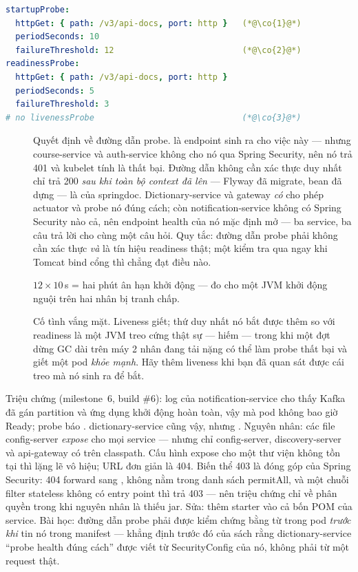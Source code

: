\begin{lstlisting}[language=yaml]
startupProbe:
  httpGet: { path: /v3/api-docs, port: http }   (*@\co{1}@*)
  periodSeconds: 10
  failureThreshold: 12                          (*@\co{2}@*)
readinessProbe:
  httpGet: { path: /v3/api-docs, port: http }
  periodSeconds: 5
  failureThreshold: 3
# no livenessProbe                              (*@\co{3}@*)
\end{lstlisting}

\begin{description}
  \item[] Quyết định về đường dẫn probe. 
  là endpoint sinh ra cho việc này --- nhưng course-service và
  auth-service không cho nó qua Spring Security, nên nó trả 401 và
  kubelet tính là thất bại. Đường dẫn không cần xác thực duy nhất chỉ
  trả 200 \emph{sau khi toàn bộ context đã lên} --- Flyway đã migrate,
  bean đã dựng --- là  của springdoc.
  Dictionary-service và gateway \emph{có} cho phép actuator và probe nó
  đúng cách; còn notification-service không có Spring Security nào cả,
  nên endpoint health của nó mặc định mở --- ba service, ba câu trả lời
  cho cùng một câu hỏi. Quy tắc:
  đường dẫn probe phải không cần xác thực \emph{và} là tín hiệu
  readiness thật; một kiểm tra  qua ngay khi Tomcat
  bind cổng thì chẳng đạt điều nào.
  \item[] $12 \times 10$\,s = hai phút ân hạn khởi động --- đo
  cho một JVM khởi động nguội trên hai nhân bị tranh chấp.
  \item[] Cố tình vắng mặt. Liveness giết; thứ duy nhất nó bắt
  được thêm so với readiness là một JVM treo cứng thật sự --- hiếm ---
  trong khi một đợt dừng GC dài trên máy 2 nhân đang tải nặng có thể làm
  probe thất bại và giết một pod \emph{khỏe mạnh}. Hãy thêm liveness khi
  bạn đã quan sát được cái treo mà nó sinh ra để bắt.
\end{description}

\begin{pitfall}
Triệu chứng (milestone~6, build \#6): log của notification-service cho
thấy Kafka đã gán partition và ứng dụng khởi động hoàn toàn, vậy mà pod
không bao giờ Ready; probe báo . dictionary-service cũng vậy,
nhưng . Nguyên nhân: các file config-server \emph{expose}
 cho mọi service --- nhưng chỉ
config-server, discovery-server và api-gateway có
 trên classpath. Cấu hình expose cho
một thư viện không tồn tại thì lặng lẽ vô hiệu; URL đơn giản là 404.
Biến thể 403 là đóng góp của Spring Security: 404 forward sang
,  không nằm trong danh sách permitAll, và
một chuỗi filter stateless không có entry point thì trả 403 --- nên
triệu chứng chỉ về phân quyền trong khi nguyên nhân là thiếu jar.
Sửa: thêm starter vào cả bốn POM của service. Bài học: đường dẫn probe
phải được kiểm chứng bằng  từ trong pod \emph{trước khi} tin
nó trong manifest --- khẳng định trước đó của sách rằng
dictionary-service ``probe health đúng cách'' được viết từ
SecurityConfig của nó, không phải từ một request thật.
\end{pitfall}

